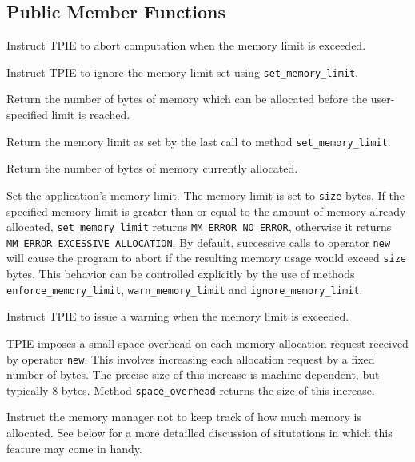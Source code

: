 \subsection{Public Member Functions}
  \btabb

     {Instruct TPIE to
    abort computation when the memory limit is exceeded.}

     {Instruct TPIE to
    ignore the memory limit set using \lstinline|set_memory_limit|.}

     {Return the number of
    bytes of memory which can be allocated before the user-specified limit
    is reached.}

  \etabb
  
  \btabb
     {Return the memory limit as
    set by the last call to method \lstinline|set_memory_limit|.}

     {Return the number of bytes
    of memory currently allocated.}

     {Set the
    application's memory limit. The memory limit is set to \lstinline|size|
    bytes. If the specified memory limit is greater than or equal to the
    amount of memory already allocated, \lstinline|set_memory_limit| returns
    \lstinline|MM_ERROR_NO_ERROR|, otherwise it returns
    \lstinline|MM_ERROR_EXCESSIVE_ALLOCATION|. By default, successive calls
    to operator \lstinline|new| will cause the program to abort if the
    resulting memory usage would exceed \lstinline|size| bytes. This behavior
    can be controlled explicitly by the use of methods
    \lstinline|enforce_memory_limit|, \lstinline|warn_memory_limit| and
    \lstinline|ignore_memory_limit|.}

     {Instruct TPIE to
    issue a warning when the memory limit is exceeded.}

     {TPIE imposes a small space
    overhead on each memory allocation request received by operator
    \lstinline|new|. This involves increasing each allocation request by a
    fixed number of bytes. The precise size of this increase is machine
    dependent, but typically 8 bytes. Method \lstinline|space_overhead|
    returns the size of this increase.}

   {Instruct the
    memory manager not to keep track of how much memory is allocated.
    See below for a more detailled discussion of situtations in which
    this feature may come in handy.}
  
